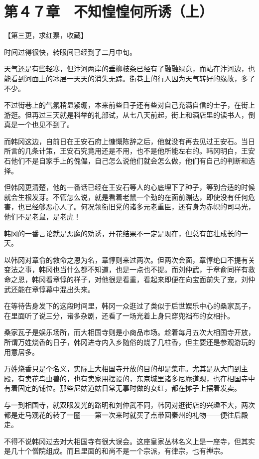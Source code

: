 \section{第４７章　不知惶惶何所诱（上）}

【第三更，求红票，收藏】

时间过得很快，转眼间已经到了二月中旬。

天气还是有些轻寒，但汴河两岸的垂柳枝条已经有了融融绿意，而站在汴河边，也能看到河面上的冰层一天天的消失无踪。街巷上的行人因为天气转好的缘故，多了不少。

不过街巷上的气氛稍显紧绷，本来前些日子还有些对自己充满自信的士子，在街上游逛。但再过三天就是科举的礼部试，从七八天前起，街上和酒店里的读书人，倒真是一个也见不到了。

而韩冈这边，自前日在王安石府上慷慨陈辞之后，他就没有再去见过王安石。当日所言的几条计策，王安石究竟用还是不用，也不是他所能左右的。韩冈明白，王安石他们不是自家手上的傀儡，自己怎么说他们就会怎么做，他们有自己的判断和选择。

但韩冈更清楚，他的一番话已经在王安石等人的心底埋下了种子，等到合适的时候就会生根发芽。不管怎么说，就是看着老鼠一个劲的在面前蹦达，即使没有任何危害，也已经够恶心人了。何况领衔旧党的诸多元老重臣，还有身为赤帜的司马光，他们不是老鼠，是老虎！

韩冈的一番言论就是恶魔的劝诱，开花结果不一定是现在，但总有茁壮成长的一天。

以韩冈对章俞的救命之恩为名，章惇则来过两次。但两次会面，章惇绝口不提有关变法之事，韩冈也当什么都不知道，也是一点也不提。而刘仲武，于章俞同样有救命之恩，韩冈看章惇的样子，对他很是看重，看起来即便在向宝面前失了宠，刘仲武还能在章惇幕中混出头来。

在等待告身发下的这段时间里，韩冈一众逛过了类似于后世娱乐中心的桑家瓦子，在里面听了说三分，诸多杂剧，还看了一场光着上身只穿兜裆布的女相扑。

桑家瓦子是娱乐场所，而大相国寺则是小商品市场。趁着每月五次大相国寺开放，所谓万姓烧香的日子，韩冈进寺内入乡随俗的烧了几柱香，但主要还是参观游玩的用意居多。

万姓烧香只是个名义，实际上大相国寺开放的目的却是集市。尤其是从大门到主殿，有卖花鸟虫兽的，也有卖家用摆设的，东京城里诸多尼庵道观，也在相国寺中有着固定的铺位。那些尼姑道姑日常无事时做的女红，都在摊子上摆着发卖。

与一到相国寺，就双眼发光的路明和刘仲武不同，韩冈对逛街店的兴趣不大，两次都是走马观花的转了一圈——第一次来时就买了点带回秦州的礼物——便往后殿走。

不得不说韩冈过去对大相国寺有很大误会。这座皇家丛林名义上是一座寺，但其实是几十个僧院组成。而且里面的和尚不是一个宗派，有律宗，也有禅宗。

